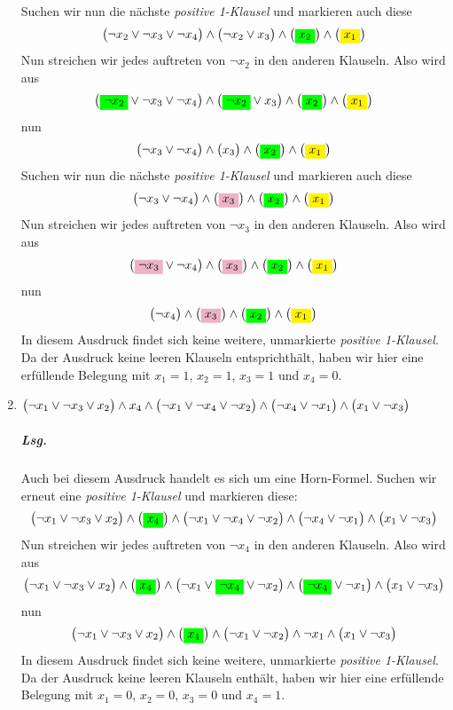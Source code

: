 \documentclass{scrreprt}
\begin{document}
\begin{enumerate}[(1)]
  Suchen wir nun die nächste \emph{positive 1-Klausel} und markieren auch diese
  \[
    \qty\big(\neg x_2 \lor \neg x_3 \lor \neg x_4) \land
    \qty\big(\neg x_2 \lor x_3) \land
    \qty\big(\colorbox{green}{$x_2$}) \land \qty\big(\colorbox{yellow}{$x_1$})
  \]
  Nun streichen wir jedes auftreten von $\neg x_2$ in den anderen Klauseln.
  Also wird aus
  \[
    \qty\big(\colorbox{green}{$\neg x_2$} \lor \neg x_3 \lor \neg x_4) \land
    \qty\big(\colorbox{green}{$\neg x_2$} \lor x_3) \land
    \qty\big(\colorbox{green}{$x_2$}) \land
    \qty\big(\colorbox{yellow}{$x_1$})
  \]
  nun
  \[
    \qty\big(\neg x_3 \lor \neg x_4) \land
    \qty\big(x_3) \land
    \qty\big(\colorbox{green}{$x_2$}) \land
    \qty\big(\colorbox{yellow}{$x_1$})
  \]
  Suchen wir nun die nächste \emph{positive 1-Klausel} und markieren auch diese
  \[
    \qty\big(\neg x_3 \lor \neg x_4) \land
    \qty\big(\colorbox{purple!30}{$x_3$}) \land
    \qty\big(\colorbox{green}{$x_2$}) \land
    \qty\big(\colorbox{yellow}{$x_1$})
  \]
  Nun streichen wir jedes auftreten von $\neg x_3$ in den anderen Klauseln.
  Also wird aus
  \[
    \qty\big(\colorbox{purple!30}{$\neg x_3$} \lor \neg x_4) \land
    \qty\big(\colorbox{purple!30}{$x_3$}) \land
    \qty\big(\colorbox{green}{$x_2$}) \land
    \qty\big(\colorbox{yellow}{$x_1$})
  \]
  nun
  \[
    \qty\big(\neg x_4) \land
    \qty\big(\colorbox{purple!30}{$x_3$}) \land
    \qty\big(\colorbox{green}{$x_2$}) \land
    \qty\big(\colorbox{yellow}{$x_1$})
  \]
  In diesem Ausdruck findet sich keine weitere, unmarkierte
  \emph{positive 1-Klausel}.
  Da der Ausdruck keine leeren Klauseln entsprichthält, haben wir hier eine
  erfüllende Belegung mit $x_1 = 1$, $x_2 = 1$, $x_3 = 1$ und $x_4 = 0$.

\newpage
\item $\qty\big(\neg x_1 \lor \neg x_3 \lor x_2) \land x_4 \land
  \qty\big(\neg x_1 \lor \neg x_4 \lor \neg x_2) \land
  \qty\big(\neg x_4 \lor \neg x_1) \land
  \qty\big(x_1 \lor \neg x_3)$

  \subparagraph{Lsg.} Auch bei diesem Ausdruck handelt es sich um eine
  Horn-Formel.
  Suchen wir erneut eine \emph{positive 1-Klausel} und markieren diese:
  \[
    \qty\big(\neg x_1 \lor \neg x_3 \lor x_2) \land
    \qty\big(\colorbox{green}{$x_4$}) \land
    \qty\big(\neg x_1 \lor \neg x_4 \lor \neg x_2) \land
    \qty\big(\neg x_4 \lor \neg x_1) \land
    \qty\big(x_1 \lor \neg x_3)
  \]
  Nun streichen wir jedes auftreten von $\neg x_4$ in den anderen Klauseln.
  Also wird aus
  \[
    \qty\big(\neg x_1 \lor \neg x_3 \lor x_2) \land
    \qty\big(\colorbox{green}{$x_4$}) \land
    \qty\big(\neg x_1 \lor \colorbox{green}{$\neg x_4$} \lor \neg x_2) \land
    \qty\big(\colorbox{green}{$\neg x_4$} \lor \neg x_1) \land
    \qty\big(x_1 \lor \neg x_3)
  \]
  nun
  \[
    \qty\big(\neg x_1 \lor \neg x_3 \lor x_2) \land
    \qty\big(\colorbox{green}{$x_4$}) \land
    \qty\big(\neg x_1 \lor \neg x_2) \land
    \neg x_1 \land
    \qty\big(x_1 \lor \neg x_3)
  \]
  In diesem Ausdruck findet sich keine weitere, unmarkierte
  \emph{positive 1-Klausel}.
  Da der Ausdruck keine leeren Klauseln enthält, haben wir hier eine
  erfüllende Belegung mit $x_1 = 0$, $x_2 = 0$, $x_3 = 0$ und $x_4 = 1$.


\end{enumerate}
\end{document}
